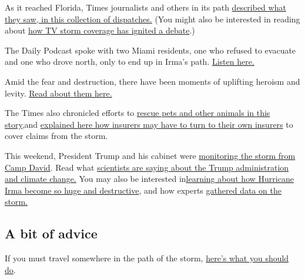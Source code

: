 As it reached Florida, Times journalists and others in its path
\href{https://www.nytimes3xbfgragh.onion/2017/09/10/us/miami-key-west-scene.html}{described
what they saw, in this collection of dispatches.} (You might also be
interested in reading about
\href{https://www.nytimes3xbfgragh.onion/2017/09/10/business/media/hurricane-irma-broadcasts-safety.html}{how
TV storm coverage has ignited a debate}.)

The Daily Podcast spoke with two Miami residents, one who refused to
evacuate and one who drove north, only to end up in Irma's path.
\href{https://www.nytimes3xbfgragh.onion/2017/09/11/podcasts/the-daily/voices-from-florida-irma.html}{Listen
here.}

Amid the fear and destruction, there have been moments of uplifting
heroism and levity.
\href{https://www.nytimes3xbfgragh.onion/2017/09/11/us/hurricane-irma-heroes-rescues.html}{Read
about them here.}

The Times also chronicled efforts to
\href{https://www.nytimes3xbfgragh.onion/2017/09/09/us/hurricane-irma-animal-rescue.html}{rescue
pets and other animals in this story,}and
\href{https://www.nytimes3xbfgragh.onion/2017/09/11/business/irma-florida-homeowner-insurance.html}{explained
here how insurers may have to turn to their own insurers} to cover
claims from the storm.

This weekend, President Trump and his cabinet were
\href{https://www.nytimes3xbfgragh.onion/2017/09/09/us/politics/trump-hurricane-irma-camp-david.html}{monitoring
the storm from Camp David}. Read what
\href{https://www.nytimes3xbfgragh.onion/2017/09/11/climate/hurricane-irma-climate-change.html}{scientists
are saying about the Trump administration and climate change.} You may
also be interested
in\href{https://www.nytimes3xbfgragh.onion/2017/09/08/climate/how-hurricane-irma-became-so-huge-and-destructive.html}{learning
about how Hurricane Irma become so huge and destructive}, and how
experts
\href{https://www.nytimes3xbfgragh.onion/2017/09/06/upshot/how-to-follow-hurricane-irma.html}{gathered
data on the storm.}

\hypertarget{a-bit-of-advice}{%
\subsection{A bit of advice}\label{a-bit-of-advice}}

If you must travel somewhere in the path of the storm,
\href{https://www.nytimes3xbfgragh.onion/2017/09/06/travel/irma-hurricane-tips.html}{here's
what you should do}.

